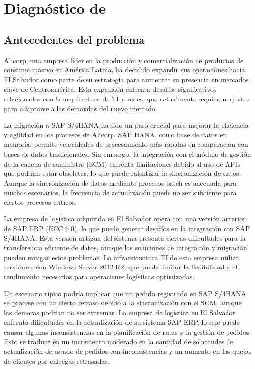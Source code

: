 \section{Diagnóstico de }
\subsection{Antecedentes del problema}

Alicorp, una empresa líder en la producción y comercialización de productos de consumo masivo en América Latina, ha decidido expandir sus operaciones hacia El Salvador como parte de su estrategia para aumentar su presencia en mercados clave de Centroamérica. Esta expansión enfrenta desafíos significativos relacionados con la arquitectura de TI y redes, que actualmente requieren ajustes para adaptarse a las demandas del nuevo mercado.

La migración a SAP S/4HANA ha sido un paso crucial para mejorar la eficiencia y agilidad en los procesos de Alicorp. SAP HANA, como base de datos en memoria, permite velocidades de procesamiento más rápidas en comparación con bases de datos tradicionales. Sin embargo, la integración con el módulo de gestión de la cadena de suministro (SCM) enfrenta limitaciones debido al uso de APIs que podrían estar obsoletas, lo que puede ralentizar la sincronización de datos. Aunque la sincronización de datos mediante procesos batch es adecuada para muchos escenarios, la frecuencia de actualización puede no ser suficiente para ciertos procesos críticos.

La empresa de logística adquirida en El Salvador opera con una versión anterior de SAP ERP (ECC 6.0), lo que puede generar desafíos en la integración con SAP S/4HANA. Esta versión antigua del sistema presenta ciertas dificultades para la transferencia eficiente de datos, aunque las soluciones de integración y migración pueden mitigar estos problemas. La infraestructura TI de esta empresa utiliza servidores con Windows Server 2012 R2, que puede limitar la flexibilidad y el rendimiento necesarios para operaciones logísticas optimizadas.

Un escenario típico podría implicar que un pedido registrado en SAP S/4HANA se procese con un cierto retraso debido a la sincronización con el SCM, aunque las demoras podrían no ser extremas. La empresa de logística en El Salvador enfrenta dificultades en la actualización de su sistema SAP ERP, lo que puede causar algunas inconsistencias en la planificación de rutas y la gestión de pedidos. Esto se traduce en un incremento moderado en la cantidad de solicitudes de actualización de estado de pedidos con inconsistencias y un aumento en las quejas de clientes por entregas retrasadas.


